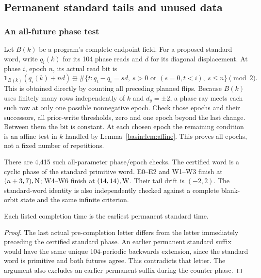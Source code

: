 \subsection{Permanent standard tails and unused data}
\subsubsection{An all-future phase test}
Let $B(k)$ be a program's complete endpoint field. For a proposed standard word,
write $q_i(k)$ for its 104 phase reads and $d$ for its diagonal displacement.
At phase $i$, epoch $n$, its actual read bit is
\begin{equation}
 \mathbf{1}_{B(k)}(q_i(k)+nd)
 \oplus\#\{t:q_t-q_i=sd,\ s>0\text{ or }(s=0,t<i),\ s\le n\}\pmod2.
                                                               \label{basin:eq:tail}
\end{equation}
This is obtained directly by counting all preceding planned flips. Because
$B(k)$ uses finitely many rows independently of $k$ and $d_y=\pm2$, a phase
ray meets each such row at only one possible nonnegative epoch. Check those
epochs and their successors, all prior-write thresholds, zero and one epoch
beyond the last change. Between them the bit is constant. At each chosen epoch
the remaining condition is an affine test in $k$ handled by
Lemma~\ref{basin:lem:affine}. This proves all epochs, not a fixed number of repetitions.

There are 4,415 such all-parameter phase/epoch checks. The certified word is a
cyclic phase of the standard primitive word. E0--E2 and W1--W3 finish at
$(n+3,7),\mathrm N$; W4--W6 finish at $(14,14),\mathrm W$. Their tail drift is
$(-2,2)$. The standard-word identity is also independently checked against a
complete blank-orbit state and the same infinite criterion.

\begin{lemma}\label{basin:lem:first}
Each listed completion time is the earliest permanent standard time.
\end{lemma}
\begin{proof}
The last actual pre-completion letter differs from the letter immediately
preceding the certified standard phase. An earlier permanent standard suffix
would have the same unique 104-periodic backwards extension, since the standard
word is primitive and both futures agree. This contradicts that letter. The
argument also excludes an earlier permanent suffix during the counter phase.
\end{proof}

